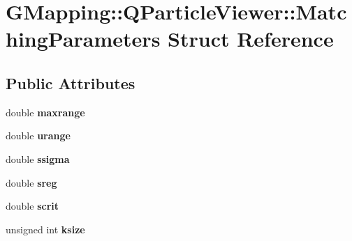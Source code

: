 \hypertarget{structGMapping_1_1QParticleViewer_1_1MatchingParameters}{}\section{G\+Mapping\+:\+:Q\+Particle\+Viewer\+:\+:Matching\+Parameters Struct Reference}
\label{structGMapping_1_1QParticleViewer_1_1MatchingParameters}
\subsection*{Public Attributes}
\begin{DoxyCompactItemize}
\item 
\mbox{\label{structGMapping_1_1QParticleViewer_1_1MatchingParameters_ac83d8f19c800d163926eaaf7a8c8dc74}} 
double {\bfseries maxrange}
\item 
\mbox{\label{structGMapping_1_1QParticleViewer_1_1MatchingParameters_a3a6ed2f3a6831b3a055b34e48e9954ce}} 
double {\bfseries urange}
\item 
\mbox{\label{structGMapping_1_1QParticleViewer_1_1MatchingParameters_a3c4d710cb5099c3d92a2d580f6000183}} 
double {\bfseries ssigma}
\item 
\mbox{\label{structGMapping_1_1QParticleViewer_1_1MatchingParameters_a6f52bc9941f4cc2af92c37961ffd4b35}} 
double {\bfseries sreg}
\item 
\mbox{\label{structGMapping_1_1QParticleViewer_1_1MatchingParameters_adeb30a451b22d8c1b5ec6be039812732}} 
double {\bfseries scrit}
\item 
\mbox{\label{structGMapping_1_1QParticleViewer_1_1MatchingParameters_a109aacf07cbbf2ff6bc5137dac67e90c}} 
unsigned int {\bfseries ksize}
\item 
\mbox{\label{structGMapping_1_1QParticleViewer_1_1MatchingParameters_a2aec455e2936ca849ba841e1481b6895}} 

\end{DoxyCompactItemize}

